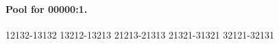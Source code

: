 \paragraph{Pool for 00000:1.}
\begingroup\footnotesize\ttfamily\begin{flushleft}
12132-13132 13212-13213 21213-21313 21321-31321 32121-32131\\
\end{flushleft}\endgroup
\begingroup
\setlength{\columnsep}{14pt}
\renewcommand{\paragraph}[1]{\par\addvspace{1ex}\noindent
  {\normalfont\small\bfseries #1}\par\nobreak}
\renewenvironment{flushleft}{\par\raggedright}{\par}
